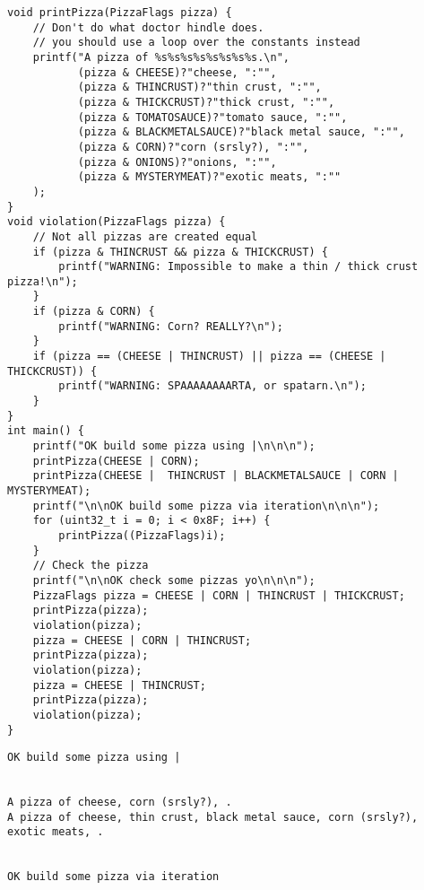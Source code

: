 \documentclass[11pt]{article}
\begin{document}
\begin{enumerate}
\begin{verbatim}
void printPizza(PizzaFlags pizza) {
    // Don't do what doctor hindle does.
    // you should use a loop over the constants instead
    printf("A pizza of %s%s%s%s%s%s%s%s.\n",
           (pizza & CHEESE)?"cheese, ":"",
           (pizza & THINCRUST)?"thin crust, ":"",
           (pizza & THICKCRUST)?"thick crust, ":"",
           (pizza & TOMATOSAUCE)?"tomato sauce, ":"",
           (pizza & BLACKMETALSAUCE)?"black metal sauce, ":"",
           (pizza & CORN)?"corn (srsly?), ":"",
           (pizza & ONIONS)?"onions, ":"",
           (pizza & MYSTERYMEAT)?"exotic meats, ":""
    );
}
void violation(PizzaFlags pizza) {
    // Not all pizzas are created equal
    if (pizza & THINCRUST && pizza & THICKCRUST) {
        printf("WARNING: Impossible to make a thin / thick crust pizza!\n");
    }
    if (pizza & CORN) {
        printf("WARNING: Corn? REALLY?\n");
    }
    if (pizza == (CHEESE | THINCRUST) || pizza == (CHEESE | THICKCRUST)) {
        printf("WARNING: SPAAAAAAAARTA, or spatarn.\n");
    }
}
int main() {
    printf("OK build some pizza using |\n\n\n");
    printPizza(CHEESE | CORN);
    printPizza(CHEESE |  THINCRUST | BLACKMETALSAUCE | CORN | MYSTERYMEAT);
    printf("\n\nOK build some pizza via iteration\n\n\n");
    for (uint32_t i = 0; i < 0x8F; i++) {
        printPizza((PizzaFlags)i);
    }
    // Check the pizza
    printf("\n\nOK check some pizzas yo\n\n\n");
    PizzaFlags pizza = CHEESE | CORN | THINCRUST | THICKCRUST;
    printPizza(pizza);
    violation(pizza);
    pizza = CHEESE | CORN | THINCRUST;
    printPizza(pizza);
    violation(pizza);
    pizza = CHEESE | THINCRUST;
    printPizza(pizza);
    violation(pizza);
}

\end{verbatim}

\begin{verbatim}
OK build some pizza using |


A pizza of cheese, corn (srsly?), .
A pizza of cheese, thin crust, black metal sauce, corn (srsly?), exotic meats, .


OK build some pizza via iteration



\end{verbatim}
\end{enumerate}
\end{document}
